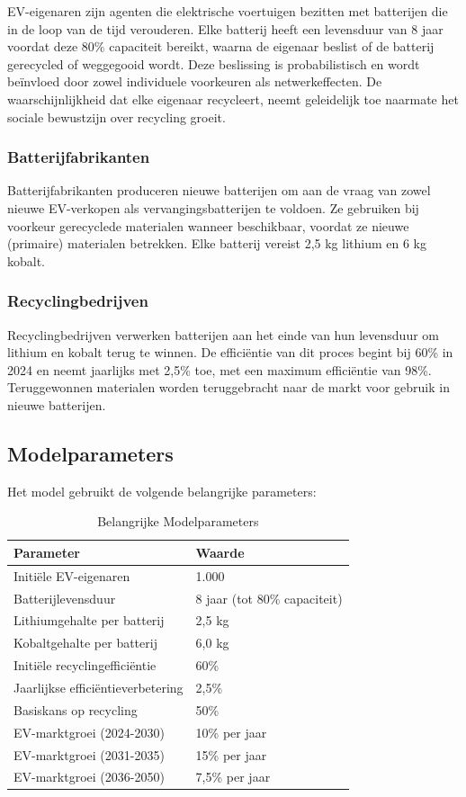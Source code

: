 \documentclass[10pt,a4paper,twocolumn]{article}
\begin{document}
EV-eigenaren zijn agenten die elektrische voertuigen bezitten met batterijen die in de loop van de tijd verouderen. Elke batterij heeft een levensduur van 8 jaar voordat deze 80\% capaciteit bereikt, waarna de eigenaar beslist of de batterij gerecycled of weggegooid wordt. Deze beslissing is probabilistisch en wordt beïnvloed door zowel individuele voorkeuren als netwerkeffecten. De waarschijnlijkheid dat elke eigenaar recycleert, neemt geleidelijk toe naarmate het sociale bewustzijn over recycling groeit.

\subsubsection{Batterijfabrikanten}

Batterijfabrikanten produceren nieuwe batterijen om aan de vraag van zowel nieuwe EV-verkopen als vervangingsbatterijen te voldoen. Ze gebruiken bij voorkeur gerecyclede materialen wanneer beschikbaar, voordat ze nieuwe (primaire) materialen betrekken. Elke batterij vereist 2,5 kg lithium en 6 kg kobalt.

\subsubsection{Recyclingbedrijven}

Recyclingbedrijven verwerken batterijen aan het einde van hun levensduur om lithium en kobalt terug te winnen. De efficiëntie van dit proces begint bij 60\% in 2024 en neemt jaarlijks met 2,5\% toe, met een maximum efficiëntie van 98\%. Teruggewonnen materialen worden teruggebracht naar de markt voor gebruik in nieuwe batterijen.

\subsection{Modelparameters}

Het model gebruikt de volgende belangrijke parameters:

\begin{table}[h]
\centering
\caption{Belangrijke Modelparameters}
\begin{tabular}{ll}
\toprule
Parameter & Waarde \\
\midrule
Initiële EV-eigenaren & 1.000 \\
Batterijlevensduur & 8 jaar (tot 80\% capaciteit) \\
Lithiumgehalte per batterij & 2,5 kg \\
Kobaltgehalte per batterij & 6,0 kg \\
Initiële recyclingefficiëntie & 60\% \\
Jaarlijkse efficiëntieverbetering & 2,5\% \\
Basiskans op recycling & 50\% \\
EV-marktgroei (2024-2030) & 10\% per jaar \\
EV-marktgroei (2031-2035) & 15\% per jaar \\
EV-marktgroei (2036-2050) & 7,5\% per jaar \\
\bottomrule
\end{tabular}
\label{tab:parameters}
\end{table}
\end{document}
